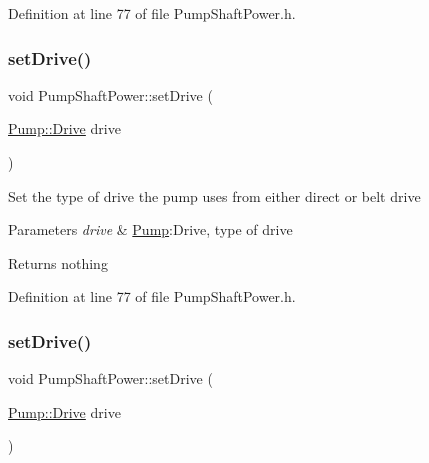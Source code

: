 Definition at line 77 of file Pump\+Shaft\+Power.\+h.

\mbox{\label{class_pump_shaft_power_a2c35a110c65c582a6f7d1d4c714f8187}} 
\subsubsection{\texorpdfstring{set\+Drive()}{setDrive()}\hspace{0.1cm}{\footnotesize\ttfamily [2/3]}}
{\footnotesize\ttfamily void Pump\+Shaft\+Power\+::set\+Drive (\begin{DoxyParamCaption}\item[{\hyperlink{class_pump_a32bf0ade131a11bb3b3fb374f638e983}{Pump\+::\+Drive}}]{drive }\end{DoxyParamCaption})\hspace{0.3cm}{\ttfamily [inline]}}

Set the type of drive the pump uses from either direct or belt drive


\begin{DoxyParams}{Parameters}
{\em drive} & \hyperlink{class_pump}{Pump}\+:Drive, type of drive\\
\hline
\end{DoxyParams}
\begin{DoxyReturn}{Returns}
nothing 
\end{DoxyReturn}


Definition at line 77 of file Pump\+Shaft\+Power.\+h.

\mbox{\label{class_pump_shaft_power_a2c35a110c65c582a6f7d1d4c714f8187}} 
\subsubsection{\texorpdfstring{set\+Drive()}{setDrive()}\hspace{0.1cm}{\footnotesize\ttfamily [3/3]}}
{\footnotesize\ttfamily void Pump\+Shaft\+Power\+::set\+Drive (\begin{DoxyParamCaption}\item[{\hyperlink{class_pump_a32bf0ade131a11bb3b3fb374f638e983}{Pump\+::\+Drive}}]{drive }\end{DoxyParamCaption})\hspace{0.3cm}{\ttfamily [inline]}}

